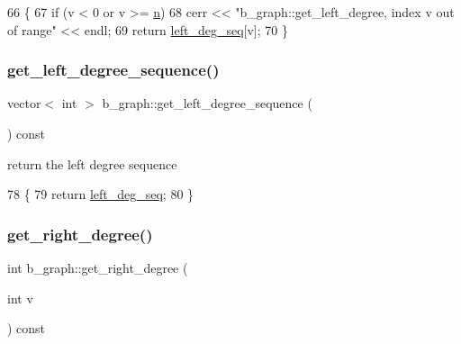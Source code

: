 \begin{DoxyCode}
66 \{
67   \textcolor{keywordflow}{if} (v < 0 or v >= \hyperlink{classb__graph_a9e211d40c1799bc9b125de472ff06642}{n})
68     cerr << \textcolor{stringliteral}{"b\_graph::get\_left\_degree, index v out of range"} << endl;
69   \textcolor{keywordflow}{return} \hyperlink{classb__graph_a311d16462dbb10c47b3a6c80a42139d9}{left\_deg\_seq}[v];
70 \}
\end{DoxyCode}
\mbox{\label{classb__graph_afd65fb655f7e24217393a10533b87d3c}} 
\subsubsection{\texorpdfstring{get\+\_\+left\+\_\+degree\+\_\+sequence()}{get\_left\_degree\_sequence()}}
{\footnotesize\ttfamily vector$<$ int $>$ b\+\_\+graph\+::get\+\_\+left\+\_\+degree\+\_\+sequence (\begin{DoxyParamCaption}{ }\end{DoxyParamCaption}) const}



return the left degree sequence 


\begin{DoxyCode}
78 \{
79   \textcolor{keywordflow}{return} \hyperlink{classb__graph_a311d16462dbb10c47b3a6c80a42139d9}{left\_deg\_seq};
80 \}
\end{DoxyCode}
\mbox{\label{classb__graph_a1caf2e1ca8ee19e7407f489be6b171b8}} 
\subsubsection{\texorpdfstring{get\+\_\+right\+\_\+degree()}{get\_right\_degree()}}
{\footnotesize\ttfamily int b\+\_\+graph\+::get\+\_\+right\+\_\+degree (\begin{DoxyParamCaption}\item[{int}]{v }\end{DoxyParamCaption}) const}



